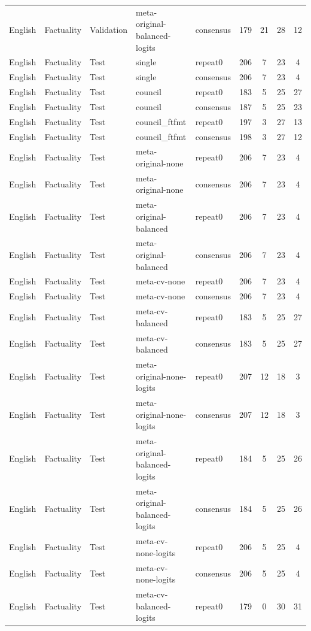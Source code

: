 \begin{tabular}{lllllcccc}
English & Factuality & Validation & meta-original-balanced-logits & consensus & 179 & 21 & 28 & 12 \\
English & Factuality & Test & single & repeat0 & 206 & 7 & 23 & 4 \\
English & Factuality & Test & single & consensus & 206 & 7 & 23 & 4 \\
English & Factuality & Test & council & repeat0 & 183 & 5 & 25 & 27 \\
English & Factuality & Test & council & consensus & 187 & 5 & 25 & 23 \\
English & Factuality & Test & council\_ftfmt & repeat0 & 197 & 3 & 27 & 13 \\
English & Factuality & Test & council\_ftfmt & consensus & 198 & 3 & 27 & 12 \\
English & Factuality & Test & meta-original-none & repeat0 & 206 & 7 & 23 & 4 \\
English & Factuality & Test & meta-original-none & consensus & 206 & 7 & 23 & 4 \\
English & Factuality & Test & meta-original-balanced & repeat0 & 206 & 7 & 23 & 4 \\
English & Factuality & Test & meta-original-balanced & consensus & 206 & 7 & 23 & 4 \\
English & Factuality & Test & meta-cv-none & repeat0 & 206 & 7 & 23 & 4 \\
English & Factuality & Test & meta-cv-none & consensus & 206 & 7 & 23 & 4 \\
English & Factuality & Test & meta-cv-balanced & repeat0 & 183 & 5 & 25 & 27 \\
English & Factuality & Test & meta-cv-balanced & consensus & 183 & 5 & 25 & 27 \\
English & Factuality & Test & meta-original-none-logits & repeat0 & 207 & 12 & 18 & 3 \\
English & Factuality & Test & meta-original-none-logits & consensus & 207 & 12 & 18 & 3 \\
English & Factuality & Test & meta-original-balanced-logits & repeat0 & 184 & 5 & 25 & 26 \\
English & Factuality & Test & meta-original-balanced-logits & consensus & 184 & 5 & 25 & 26 \\
English & Factuality & Test & meta-cv-none-logits & repeat0 & 206 & 5 & 25 & 4 \\
English & Factuality & Test & meta-cv-none-logits & consensus & 206 & 5 & 25 & 4 \\
English & Factuality & Test & meta-cv-balanced-logits & repeat0 & 179 & 0 & 30 & 31 \\

\end{tabular}
